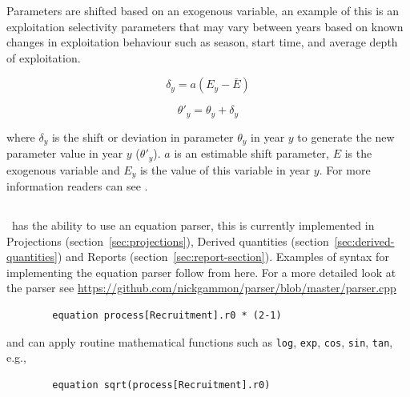 \subsubsection[Exogenous]{}

Parameters are shifted based on an exogenous variable, an example of this is an exploitation selectivity parameters that may vary between years based on known changes in exploitation behaviour such as season, start time, and average depth of exploitation.

\begin{equation}
\delta_y = a(E_y - \bar{E})
\end{equation}

\begin{equation}
\theta'_y = \theta_y + \delta_y
\end{equation}

where $\delta_y$ is the shift or deviation in parameter $\theta_y$ in year $y$ to generate the new parameter value in year $y$ ($\theta'_y$). $a$ is an estimable shift parameter, $E$ is the exogenous variable and $E_y$ is the value of this variable in year $y$. For more information readers can see \cite{francis_03}.

\subsection{\label{sec:eq_parser}}

\CNAME\ has the ability to use an equation parser, this is currently implemented in Projections (section~\ref{sec:projections}), Derived quantities (section~\ref{sec:derived-quantities}) and Reports (section~\ref{sec:report-section}). Examples of syntax for implementing the equation parser follow from here. For a more detailed look at the parser see \url{https://github.com/nickgammon/parser/blob/master/parser.cpp}\\


{\small{\begin{verbatim}
		equation process[Recruitment].r0 * (2-1)
		\end{verbatim}}}

and can apply routine mathematical functions such as \texttt{log},  \texttt{exp},  \texttt{cos}, \texttt{sin}, \texttt{tan}, e.g.,
{\small{\begin{verbatim}
		equation sqrt(process[Recruitment].r0)
		\end{verbatim}}}

